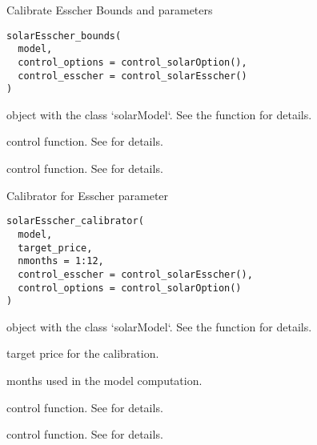 \documentclass[a4paper]{book}
\begin{document}
%
\begin{Description}\relax
Calibrate Esscher Bounds and parameters
\end{Description}
%
\begin{Usage}
\begin{verbatim}
solarEsscher_bounds(
  model,
  control_options = control_solarOption(),
  control_esscher = control_solarEsscher()
)
\end{verbatim}
\end{Usage}
%
\begin{Arguments}
\begin{ldescription}
\item[\code{model}] object with the class `solarModel`. See the function  for details.

\item[\code{control\_options}] control function. See  for details.

\item[\code{control\_esscher}] control function. See  for details.
\end{ldescription}
\end{Arguments}
%
\begin{Description}\relax
Calibrator for Esscher parameter
\end{Description}
%
\begin{Usage}
\begin{verbatim}
solarEsscher_calibrator(
  model,
  target_price,
  nmonths = 1:12,
  control_esscher = control_solarEsscher(),
  control_options = control_solarOption()
)
\end{verbatim}
\end{Usage}
%
\begin{Arguments}
\begin{ldescription}
\item[\code{model}] object with the class `solarModel`. See the function  for details.

\item[\code{target\_price}] target price for the calibration.

\item[\code{nmonths}] months used in the model computation.

\item[\code{control\_esscher}] control function. See  for details.

\item[\code{control\_options}] control function. See  for details.
\end{ldescription}
\end{Arguments}
\end{document}
